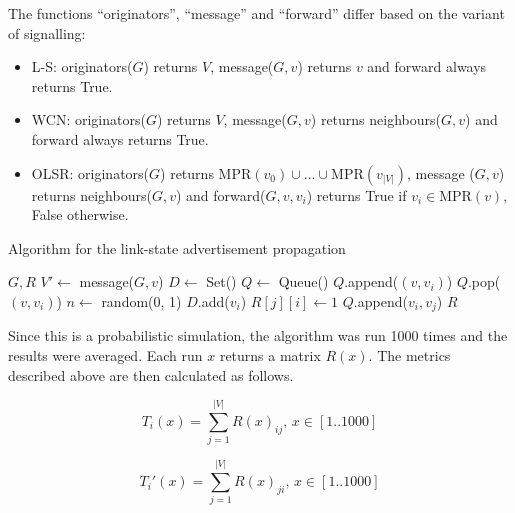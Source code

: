 \documentclass[a4paper,11pt,twoside,openright]{memoir}
\newcommand{\mpr}{\mathrm{MPR}}
\begin{document}
The functions ``originators'', ``message'' and ``forward'' differ
based on the variant of signalling:

\begin{itemize}
\itemsep1pt\parskip0pt
\item
  L-S: originators($G$) returns $V$, message($G, v$) returns $v$ and
  forward always returns True.
\item
  WCN: originators($G$) returns $V$, message($G, v$) returns
  neighbours($G, v$) and forward always returns True.
\item
  OLSR: originators($G$) returns $\mpr(v_0) \cup \ldots \cup \mpr(v_{|V|})$,
  message ($G, v$) returns neighbours($G, v$) and forward($G, v, v_i$)
  returns True if $v_i \in \mpr(v)$, False otherwise.
\end{itemize}

\begin{algorithm}
  \caption{Algorithm for the link-state advertisement propagation}
  \label{alg:mp}
  \begin{algorithmic}
    \REQUIRE $G, R$
      \STATE $V' \leftarrow $ message($G, v$)
      \STATE $D \leftarrow $ Set()
      \STATE $Q \leftarrow $ Queue()
        \STATE $Q$.append($(v, v_i)$)
      \ENDFOR
        \STATE $Q$.pop($(v, v_i)$)
        \STATE $n \leftarrow $ random(0, 1)
          \STATE $D$.add($v_i$)
            \STATE $R[j][i] \leftarrow 1$
          \ENDFOR
              \STATE $Q$.append($v_i, v_j$)
            \ENDFOR
          \ENDIF
        \ENDIF
      \ENDWHILE
    \ENDFOR
    \RETURN $R$
  \end{algorithmic}
\end{algorithm}

Since this is a probabilistic simulation, the algorithm was run 1000
times and the results were averaged. Each run $x$ returns a matrix $R(x)$.
The metrics described above are then calculated as follows.

\begin{equation}
T_i(x) = \sum_{j=1}^{|V|} R(x)_{ij},\, x \in [1..1000]
\end{equation}

\begin{equation}
T_i'(x) = \sum_{j=1}^{|V|} R(x)_{ji},\, x \in [1..1000]
\end{equation}
\end{document}
